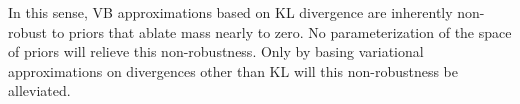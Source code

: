 
In this sense, VB approximations based on KL divergence are inherently
non-robust to priors that ablate mass nearly to zero.  No parameterization of
the space of priors will relieve this non-robustness.  Only by basing
variational approximations on divergences other than KL will this non-robustness
be alleviated.
